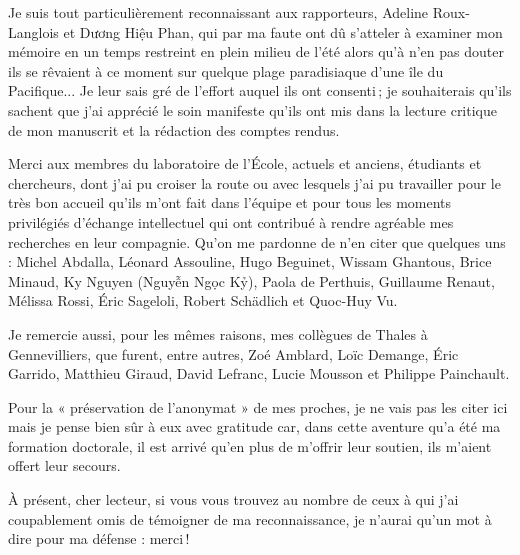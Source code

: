 Je suis tout particulièrement reconnaissant aux rapporteurs, Adeline Roux-Langlois et Dương Hiệu Phan, qui par ma faute ont dû s’atteler à examiner mon mémoire en un temps restreint en plein milieu de l’été alors qu’à n’en pas douter ils se rêvaient à ce moment sur quelque plage paradisiaque d’une île du Pacifique... Je leur sais gré de l’effort auquel ils ont consenti ; je souhaiterais qu’ils sachent que j’ai apprécié le soin manifeste qu’ils ont mis dans la lecture critique de mon manuscrit et la rédaction des comptes rendus.\par

Merci aux membres du laboratoire de l’École, actuels et anciens, étudiants et chercheurs, dont j’ai pu croiser la route ou avec lesquels j’ai pu travailler pour le très bon accueil qu’ils m’ont fait dans l’équipe et pour tous les moments privilégiés d’échange intellectuel qui ont contribué à rendre agréable mes recherches en leur compagnie. Qu’on me pardonne de n’en citer que quelques uns : Michel Abdalla, Léonard Assouline, Hugo Beguinet, Wissam Ghantous, Brice Minaud, Ky Nguyen (Nguyễn Ngọc Kỷ), Paola de Perthuis, Guillaume Renaut, Mélissa Rossi, Éric Sageloli, Robert Schädlich et Quoc-Huy Vu.\par

Je remercie aussi, pour les mêmes raisons, mes collègues de Thales à Gennevilliers, que furent, entre autres, Zoé Amblard, Loïc Demange, Éric Garrido, Matthieu Giraud, David Lefranc, Lucie Mousson et Philippe Painchault.

Pour la « préservation de l’anonymat » de mes proches, je ne vais pas les citer ici mais je pense bien sûr à eux avec gratitude car, dans cette aventure qu’a été ma formation doctorale, il est arrivé qu’en plus de m’offrir leur soutien, ils m’aient offert leur secours.\par

À présent, cher lecteur, si vous vous trouvez au nombre de ceux à qui j’ai coupablement omis de témoigner de ma reconnaissance, je n’aurai qu’un mot à dire pour ma défense : merci !\par





